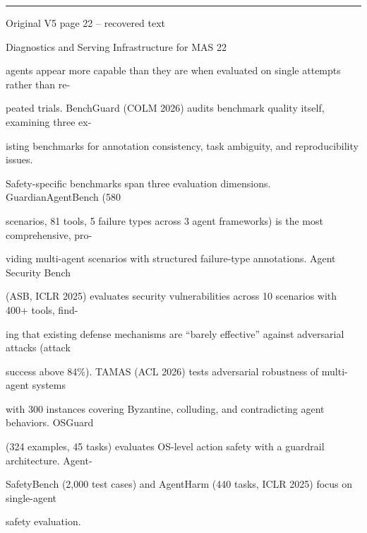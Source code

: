 \par\smallskip\noindent\rule{\textwidth}{0.4pt}\par{\sffamily\footnotesize Original V5 page 22 -- recovered text}\par\begin{flushleft}\footnotesize\ttfamily
\par\smallskip
\par\smallskip
\noindent Diagnostics and Serving Infrastructure for MAS 22\par
\par\smallskip
\par\smallskip
\par\smallskip
\noindent agents appear more capable than they are when evaluated on single attempts rather than re-\par
\noindent peated trials. BenchGuard (COLM 2026) audits benchmark quality itself, examining three ex-\par
\noindent isting benchmarks for annotation consistency, task ambiguity, and reproducibility issues.\par
\noindent  Safety-specific benchmarks span three evaluation dimensions. GuardianAgentBench (580\par
\noindent scenarios, 81 tools, 5 failure types across 3 agent frameworks) is the most comprehensive, pro-\par
\noindent viding multi-agent scenarios with structured failure-type annotations. Agent Security Bench\par
\noindent (ASB, ICLR 2025) evaluates security vulnerabilities across 10 scenarios with 400+ tools, find-\par
\noindent ing that existing defense mechanisms are “barely effective” against adversarial attacks (attack\par
\noindent success above 84\%). TAMAS (ACL 2026) tests adversarial robustness of multi-agent systems\par
\noindent with 300 instances covering Byzantine, colluding, and contradicting agent behaviors. OSGuard\par
\noindent (324 examples, 45 tasks) evaluates OS-level action safety with a guardrail architecture. Agent-\par
\noindent SafetyBench (2,000 test cases) and AgentHarm (440 tasks, ICLR 2025) focus on single-agent\par
\noindent safety evaluation.\par
\par\smallskip

\end{flushleft}
